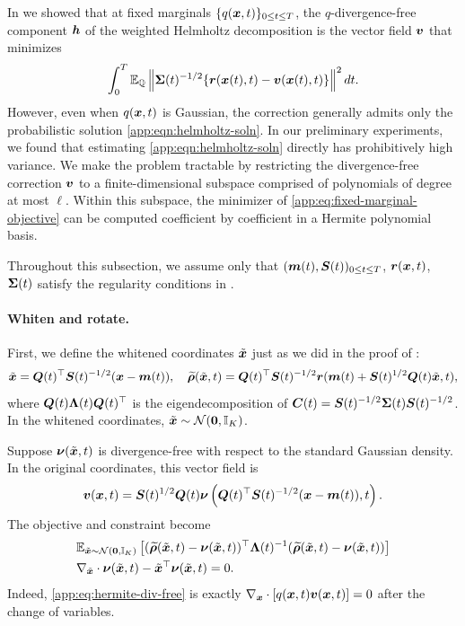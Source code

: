 In  we showed that at fixed marginals $\{q(\boldsymbol{x}, t)\}_{0 \leq t \leq T}$, the $q$-divergence-free component $\boldsymbol{h}$ of the weighted Helmholtz decomposition is the vector field $\boldsymbol{v}$ that minimizes
\begin{equation}\label{app:eq:fixed-marginal-objective}
\int_0^T \mathbb{E}_{\mathbb{Q}} \left\|\boldsymbol{\Sigma}(t)^{-1/2} \{\boldsymbol{r}(\boldsymbol{x}(t), t)-\boldsymbol{v}(\boldsymbol{x}(t), t)\}\right\|^2dt.
\end{equation}
However, even when $q(\boldsymbol{x}, t)$ is Gaussian, the correction generally admits only the probabilistic solution \cref{app:eqn:helmholtz-soln}.
In our preliminary experiments, we found that estimating \cref{app:eqn:helmholtz-soln} directly has prohibitively high variance.
We make the problem tractable by restricting the divergence-free correction $\boldsymbol{v}$ to a finite-dimensional subspace comprised of polynomials of degree at most $\ell$.
Within this subspace, the minimizer of \cref{app:eq:fixed-marginal-objective} can be computed coefficient by coefficient in a Hermite polynomial basis.

Throughout this subsection, we assume only that $(\boldsymbol{m}(t),\boldsymbol{S}(t))_{0 \leq t \leq T}$, $\boldsymbol{r}(\boldsymbol{x}, t)$, $\boldsymbol{\Sigma}(t)$ satisfy the regularity conditions in .

\paragraph{Whiten and rotate.}
First, we define the whitened coordinates $\tilde{\boldsymbol{x}}$ just as we did in the proof of :
\begin{equation}\label{app:eq:hermite-coordinates}
\tilde{\boldsymbol{x}} = \boldsymbol{Q}(t)^\top\boldsymbol{S}(t)^{-1/2}(\boldsymbol{x}-\boldsymbol{m}(t)), \quad \widetilde{\boldsymbol{\rho}}(\tilde{\boldsymbol{x}}, t) =\boldsymbol{Q}(t)^\top\boldsymbol{S}(t)^{-1/2}\boldsymbol{r}(\boldsymbol{m}(t)+\boldsymbol{S}(t)^{1/2}\boldsymbol{Q}(t)\tilde{\boldsymbol{x}}, t),
\end{equation}
where $\boldsymbol{Q}(t)\boldsymbol{\Lambda}(t)\boldsymbol{Q}(t)^\top$ is the eigendecomposition of $\boldsymbol{C}(t)=\boldsymbol{S}(t)^{-1/2}\boldsymbol{\Sigma}(t)\boldsymbol{S}(t)^{-1/2}$.
In the whitened coordinates, $\tilde{\boldsymbol{x}}\sim\mathcal{N}(\boldsymbol{0},\mathbb{I}_K)$.

Suppose $\boldsymbol{\nu}(\tilde{\boldsymbol{x}},t)$ is divergence-free with respect to the standard Gaussian density.
In the original coordinates, this vector field is
\begin{equation}\label{app:eq:hermite-unwhiten}
\boldsymbol{v}(\boldsymbol{x}, t) =\boldsymbol{S}(t)^{1/2}\boldsymbol{Q}(t)\boldsymbol{\nu}\left(\boldsymbol{Q}(t)^\top\boldsymbol{S}(t)^{-1/2}(\boldsymbol{x}-\boldsymbol{m}(t)), t\right).
\end{equation}
The objective and constraint become
\begin{align}
&\mathbb{E}_{\tilde{\boldsymbol{x}}\sim\mathcal{N}(\boldsymbol{0},\mathbb{I}_K)}\left[(\widetilde{\boldsymbol{\rho}}(\tilde{\boldsymbol{x}},t)-\boldsymbol{\nu}(\tilde{\boldsymbol{x}},t))^\top\boldsymbol{\Lambda}(t)^{-1}(\widetilde{\boldsymbol{\rho}}(\tilde{\boldsymbol{x}},t)-\boldsymbol{\nu}(\tilde{\boldsymbol{x}},t))\right]\label{app:eq:hermite-objective}\\
&\nabla_{\tilde{\boldsymbol{x}}}\cdot\boldsymbol{\nu}(\tilde{\boldsymbol{x}},t)-\tilde{\boldsymbol{x}}^\top\boldsymbol{\nu}(\tilde{\boldsymbol{x}},t)=0.\label{app:eq:hermite-div-free}
\end{align}
Indeed, \cref{app:eq:hermite-div-free} is exactly $\nabla_{\boldsymbol{x}}\cdot[q(\boldsymbol{x},t)\boldsymbol{v}(\boldsymbol{x},t)]=0$ after the change of variables.

